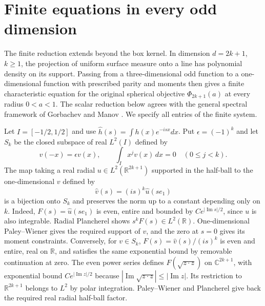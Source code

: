 \documentclass[11pt,a4paper]{article}
\numberwithin{equation}{section}
\begin{document}
\section{Finite equations in every odd dimension}
\label{sec:efimov-odd}
The finite reduction extends beyond the box kernel. In dimension $d=2k+1$, $k\ge1$, the projection of uniform surface measure onto a line has polynomial density on its support. Passing from a three-dimensional odd function to a one-dimensional function with prescribed parity and moments then gives a finite characteristic equation for the original spherical objective $\Phi_{2k+1}(a)$ at every radius $0<a<1$. The scalar reduction below agrees with the general spectral framework of Gorbachev and Manov \cite[Sec.~5, eq.~(5.5)]{GM}. We specify all entries of the finite system.

Let $I=[-1/2,1/2]$ and use $\widehat h(s)=\int h(x)e^{-isx}dx$. Put $\epsilon=(-1)^k$ and let $S_k$ be the closed subspace of real $L^2(I)$ defined by
\[
 v(-x)=\epsilon v(x),\qquad \int_I x^jv(x)\,dx=0\quad (0\le j<k).
\]
The map taking a real radial $u\in L^2(\mathbb R^{2k+1})$ supported in the half-ball to the one-dimensional $v$ defined by
\[
 \widehat v(s)=(is)^k\widehat u(se_1)
\]
is a bijection onto $S_k$ and preserves the norm up to a constant depending only on $k$. Indeed, $F(s)=\widehat u(se_1)$ is even, entire and bounded by $C e^{|\operatorname{Im}s|/2}$, since $u$ is also integrable. Radial Plancherel shows $s^k F(s)\in L^2(\mathbb R)$. One-dimensional Paley--Wiener gives the required support of $v$, and the zero at $s=0$ gives its moment constraints. Conversely, for $v\in S_k$, $F(s)=\widehat v(s)/(is)^k$ is even and entire, real on $\mathbb R$, and satisfies the same exponential bound by removable continuation at zero. The even power series defines $F(\sqrt{z\cdot z})$ on $\mathbb C^{2k+1}$, with exponential bound $C e^{|\operatorname{Im}z|/2}$ because $|\operatorname{Im}\sqrt{z\cdot z}|\le|\operatorname{Im}z|$. Its restriction to $\mathbb R^{2k+1}$ belongs to $L^2$ by polar integration. Paley--Wiener and Plancherel give back the required real radial half-ball factor.
\end{document}
